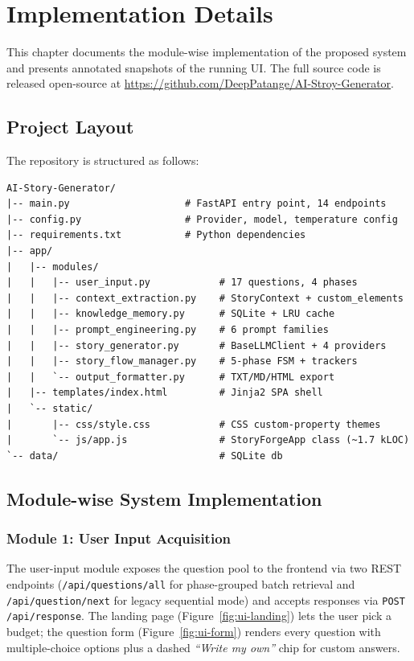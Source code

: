 \chapter{Implementation Details}
\label{ch:impl}

This chapter documents the module-wise implementation of the
proposed system and presents annotated snapshots of the running UI.
The full source code is released open-source at
\url{https://github.com/DeepPatange/AI-Stroy-Generator}.

\section{Project Layout}
The repository is structured as follows:

\begin{lstlisting}
AI-Story-Generator/
|-- main.py                    # FastAPI entry point, 14 endpoints
|-- config.py                  # Provider, model, temperature config
|-- requirements.txt           # Python dependencies
|-- app/
|   |-- modules/
|   |   |-- user_input.py            # 17 questions, 4 phases
|   |   |-- context_extraction.py    # StoryContext + custom_elements
|   |   |-- knowledge_memory.py      # SQLite + LRU cache
|   |   |-- prompt_engineering.py    # 6 prompt families
|   |   |-- story_generator.py       # BaseLLMClient + 4 providers
|   |   |-- story_flow_manager.py    # 5-phase FSM + trackers
|   |   `-- output_formatter.py      # TXT/MD/HTML export
|   |-- templates/index.html         # Jinja2 SPA shell
|   `-- static/
|       |-- css/style.css            # CSS custom-property themes
|       `-- js/app.js                # StoryForgeApp class (~1.7 kLOC)
`-- data/                            # SQLite db
\end{lstlisting}

\section{Module-wise System Implementation}

\subsection{Module 1: User Input Acquisition}
The user-input module exposes the question pool to the frontend via
two REST endpoints (\texttt{/api/questions/all} for phase-grouped
batch retrieval and \texttt{/api/question/next} for legacy sequential
mode) and accepts responses via \texttt{POST /api/response}. The
landing page (Figure~\ref{fig:ui-landing}) lets the user pick a
budget; the question form (Figure~\ref{fig:ui-form}) renders every
question with multiple-choice options plus a dashed
\emph{``Write my own''} chip for custom answers.

